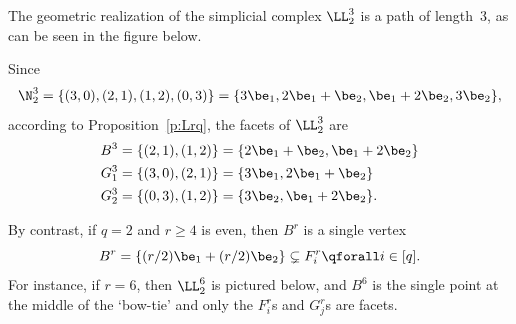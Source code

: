 \begin{exam}\label{e:q=2}
The geometric realization of the simplicial complex $\LL^3_2$
is a path of length~3, as can be seen in the figure below.

\begin{center}
\end{center}
Since $$\N^3_2 =\{(3,0),(2,1),(1,2),(0,3)\} = \{3\be_1, 2\be_1+\be_2, \be_1+2\be_2, 3\be_2\},$$ according to Proposition~\ref{p:Lrq}, the facets of
$\LL^3_2$ are
\begin{align*}
B^3 &= \{(2,1),(1,2)\} = \{2\be_1 + \be_2, \be_1+ 2\be_2\}\\
G^3_1 &= \{(3,0),(2,1)\} = \{3\be_1, 2\be_1 + \be_2\}\\
G^3_2 &= \{(0,3),(1,2)\} = \{3\be_2, \be_1 + 2\be_2\}.
\end{align*}


By contrast, if $q=2$ and $r \geq 4$ is even, then
$B^r$ is a single vertex
$$B^r = \{(r/2)\be_1 + (r/2)\be_2 \} \subsetneq F^r_i \qforall i \in
[q].$$ For instance, if $r=6$, then $\LL^6_2$ is pictured below, and
$B^6$ is the single point at the middle of the `bow-tie' and only the
$F^r_i$s and $G^r_j$s are facets.


\end{exam}
